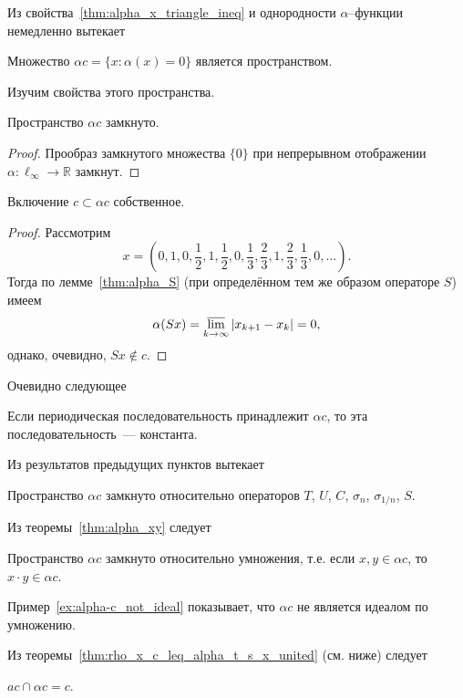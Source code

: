 Из свойства~\ref{thm:alpha_x_triangle_ineq} и однородности $\alpha$--функции немедленно вытекает
\begin{theorem}
	Множество $\alpha c = \{x: \alpha(x) = 0\}$
	является пространством.
\end{theorem}
Изучим свойства этого пространства.
\begin{property}
	Пространство $\alpha c$ замкнуто.
\end{property}
\begin{proof}
	Прообраз замкнутого множества $\{0\}$
	при непрерывном отображении $\alpha : \ell_\infty \to \mathbb{R}$
	замкнут.
\end{proof}
\begin{theorem}
	Включение $c \subset \alpha c$ собственное.
\end{theorem}
\begin{proof}
	Рассмотрим
	\begin{equation}
		x=\left(
			0,1,
			0,\frac{1}{2},1,\frac{1}{2},
			0,\frac{1}{3},\frac{2}{3},1,\frac{2}{3},\frac{1}{3},
			0,
			...
		\right)
		.
	\end{equation}
	Тогда по лемме~\ref{thm:alpha_S} (при определённом тем же образом операторе $S$) имеем
	\begin{equation}
		\alpha(Sx) = \varlimsup_{k\to\infty} |x_{k+1} - x_{k}| = 0
		,
	\end{equation}
	однако, очевидно, $Sx\notin c$.
\end{proof}
Очевидно следующее
\begin{property}
	Если периодическая последовательность принадлежит $\alpha c$,
	то эта последовательность~--- константа.
\end{property}

Из результатов предыдущих пунктов вытекает
\begin{theorem}
	Пространство $\alpha c$ замкнуто относительно операторов $T$, $U$, $C$, $\sigma_n$, $\sigma_{1/n}$, $S$.
\end{theorem}

Из теоремы~\ref{thm:alpha_xy} следует
\begin{theorem}
	Пространство $\alpha c$ замкнуто относительно умножения,
	т.е. если $x,y\in\alpha c$, то $x\cdot y \in \alpha c$.
\end{theorem}

Пример~\ref{ex:alpha-c_not_ideal} показывает, что $\alpha c$
не является идеалом по умножению.

Из теоремы~\ref{thm:rho_x_c_leq_alpha_t_s_x_united} (см. ниже) следует
\begin{theorem}
	$ac \cap\alpha c = c$.
\end{theorem}

